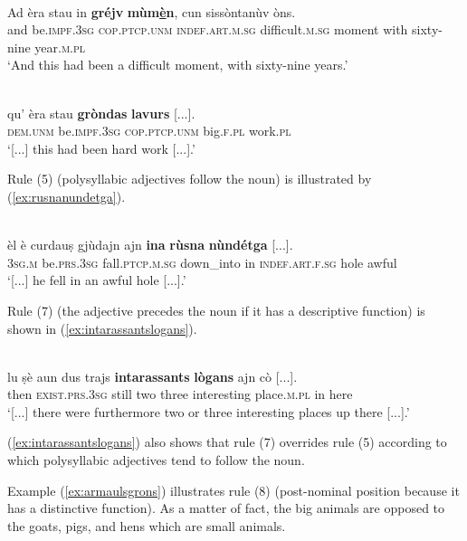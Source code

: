 \ea
\label{ex:grejvmumen}
\\
\gll    Ad èra stau in \textbf{gréjv} \textbf{mùm\underline{è}n}, cun sissòntanùv òns.\\
and be.\textsc{impf.3sg} \textsc{cop.ptcp.unm} \textsc{indef.art.m.sg} difficult.\textsc{m.sg} moment with sixty-nine year.\textsc{m.pl} \\
\glt `And this had been a difficult moment, with sixty-nine years.'
\z 

\ea
\label{ex:grondaslavurs}
\\
\gll [...] qu’ èra stau \textbf{gròndas} \textbf{lavurs} [...].\\
{} \textsc{dem.unm} be.\textsc{impf.3sg} \textsc{cop.ptcp.unm} big.\textsc{f.pl} work.\textsc{pl}\\
\glt `[...] this had been hard work [...].'
\z

Rule (5) (polysyllabic adjectives follow the noun) is illustrated by (\ref{ex:rusnanundetga}).

\ea
\label{ex:rusnanundetga}
\\
\gll  [...] èl è curdauṣ gjùdajn ajn \textbf{ina} \textbf{rùsna} \textbf{nùndétga} [...].  \\
{} \textsc{3sg.m} be.\textsc{prs.3sg} fall.\textsc{ptcp.m.sg} down\_into in \textsc{indef.art.f.sg} hole awful\\
\glt `[...] he fell in an awful hole [...].'
\z

Rule (7) (the adjective precedes the noun if it has a descriptive function) is shown in (\ref{ex:intarassantslogans}).

\ea
\label{ex:intarassantslogans}
\\
\gll [...] lu ṣè aun dus trajs \textbf{intarassants} \textbf{lògans} ajn cò [...].\\
 {} then \textsc{exist.prs.3sg} still two three interesting place.\textsc{m.pl} in here\\
\glt `[...] there were furthermore two or three interesting places up there [...].'
\z

(\ref{ex:intarassantslogans}) also shows that rule (7) overrides rule (5) according to which polysyllabic adjectives tend to follow the noun.

Example (\ref{ex:armaulsgrons}) illustrates rule (8) (post-nominal position because it has a distinctive function). As a matter of fact, the big animals are opposed to the goats, pigs, and hens which are small animals.

